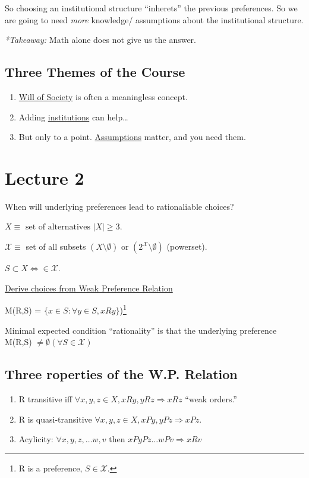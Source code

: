\documentclass{article}
\newcommand{\X}{\mathcal{X}}
\begin{document}
So choosing an institutional structure ``inherets'' the previous preferences. So we are going to need \emph{more} knowledge/ assumptions about the institutional structure.

\emph{*Takeaway:} Math alone does not give us the answer.

\subsection*{Three Themes of the Course}
\begin{enumerate}

\item \underline{Will of Society} is often a meaningless concept.
\item Adding \underline{institutions} can help\dots
\item But only to a point. \underline{Assumptions} matter, and you need them.
\end{enumerate}%

\section*{Lecture 2}


When will underlying preferences lead to rationaliable choices?

$X \equiv \text{ set of alternatives } |X| \geq 3$. 

$\X \equiv$ set of all subsets $(X\setminus \emptyset)$ or $(2^\X \setminus \emptyset)$ (powerset). 

$S\subset X \Leftrightarrow \in \X$.

\bigskip

\underline{Derive choices from Weak Preference Relation}

M(R,S) = $\{x\in S:\forall y \in S, xRy\}$)\footnote{R is a preference, $S \in \X$.}

Minimal expected condition ``rationality'' is that the underlying preference M(R,S) $\neq \emptyset (\forall S \in \X)$

\subsection*{Three {roperties of the W.P. Relation}}


\begin{enumerate}

\item R transitive iff $\forall x,y,z \in X, xRy, yRz \Rightarrow xRz$ ``weak orders.''
\item R is quasi-transitive $\forall x,y,z \in X, xPy, yPz \Rightarrow xPz.$
\item Acylicity: $\forall x,y,z,\dots w,v$ then $xPyPz \dots wPv \Rightarrow xRv$
\end{enumerate}
\end{document}
